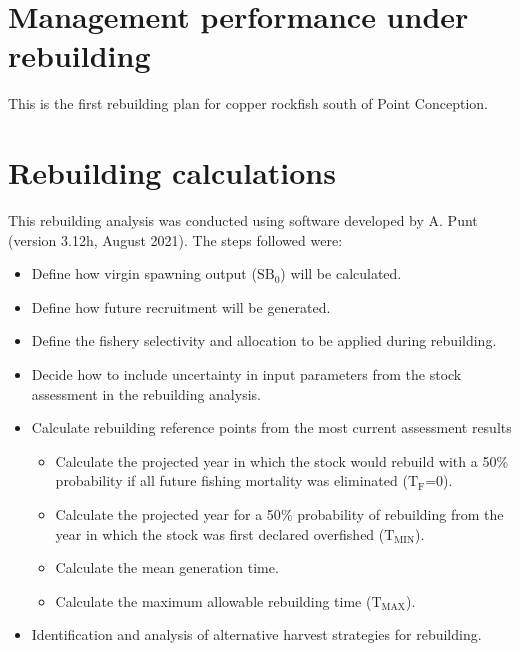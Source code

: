 \documentclass[11pt,
  english,
  a4paper,
]{article}
\begin{document}
\hypertarget{management-performance-under-rebuilding}{%
\section{Management performance under rebuilding}\label{management-performance-under-rebuilding}}

\leavevmode\tagmcend\tagstructend


This is the first rebuilding plan for copper rockfish south of Point Conception.

\leavevmode\tagmcend\tagstructend\par


\hypertarget{rebuilding-calculations}{%
\section{Rebuilding calculations}\label{rebuilding-calculations}}

\leavevmode\tagmcend\tagstructend


This rebuilding analysis was conducted using software developed by A. Punt (version 3.12h, August 2021). The steps followed were:

\leavevmode\tagmcend\tagstructend\par

\begin{itemize}
    \item Define how virgin spawning output ($\text{SB}_0$) will be calculated. 
    \item Define how future recruitment will be generated. 
    \item Define the fishery selectivity and allocation to be applied during rebuilding. 
    \item Decide how to include uncertainty in input parameters from the stock assessment in the rebuilding analysis. 
    \item Calculate rebuilding reference points from the most current assessment results 
    \begin{itemize}
        \item Calculate the projected year in which the stock would rebuild with a 50$\%$ probability if all future fishing mortality was eliminated ($\text{T}_\text{F}$=0).
        \item  Calculate the projected year for a 50$\%$ probability of rebuilding from the year in which the stock was first declared overfished ($\text{T}_\text{MIN}$). 
        \item Calculate the mean generation time. 
        \item Calculate the maximum allowable rebuilding time ($\text{T}_\text{MAX}$). 
    \end{itemize}
    \item Identification and analysis of alternative harvest strategies for rebuilding. 
\end{itemize}
\end{document}
